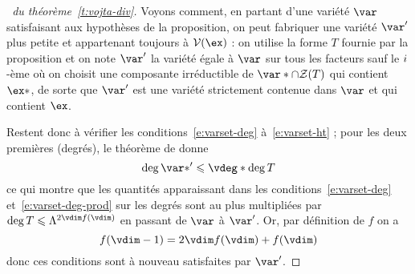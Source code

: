 \begin{proof}[\proofname\ du théorème~\vref{t:vojta-div}]
  Voyons comment, en partant d'une variété \( \var \) satisfaisant aux
  hypothèses de la proposition, on peut fabriquer une variété \( \var' \) plus
  petite et appartenant toujours à \( \varset(\ex) \) : on utilise la forme
  \( T \) fournie par la proposition et on note
  \( \var' \) la variété égale à \( \var \) sur tous les facteurs sauf le \(
    i \)-ème où on choisit une composante irréductible de
  \( \var* \cap \zeros T \) qui contient \( \ex* \), de sorte que \( \var' \)
  est une variété strictement contenue dans \( \var \) et qui contient \( \ex
  \).

  Restent donc à vérifier les conditions~\eqref{e:varset-deg}
  à~\eqref{e:varset-ht} ; pour les deux premières (degrés), le théorème de
   donne
  \begin{equation}
    \deg \var*' \le \vdeg* \deg T
  \end{equation}
  ce qui montre que les quantités apparaissant dans les
  conditions~\eqref{e:varset-deg} et~\eqref{e:varset-deg-prod} sur les degrés
  sont au plus multipliées par \( \deg T \le \Lambda^{2\vdim f(\vdim)} \) en
  passant de \( \var \) à \( \var' \). Or, par définition de \( f \) on a
  \begin{equation} \label{e:ct-f}
    f(\vdim-1) = 2\vdim f(\vdim) + f(\vdim)
  \end{equation}
  donc ces conditions sont à nouveau satisfaites par \( \var' \).


\end{proof}

